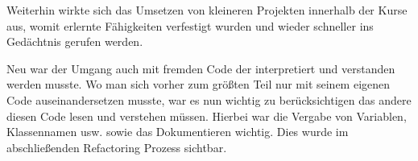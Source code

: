 Weiterhin wirkte  sich das Umsetzen von kleineren Projekten innerhalb der Kurse aus, womit erlernte Fähigkeiten  verfestigt wurden und wieder schneller ins Gedächtnis gerufen werden.%

Neu war der Umgang auch mit fremden Code der interpretiert und verstanden werden musste. Wo man sich vorher zum größten Teil nur mit seinem eigenen Code auseinandersetzen musste, war es nun wichtig zu berücksichtigen das andere diesen Code lesen und verstehen müssen. Hierbei war die Vergabe von Variablen, Klassennamen usw. sowie das Dokumentieren wichtig. Dies wurde im abschließenden Refactoring Prozess sichtbar.







